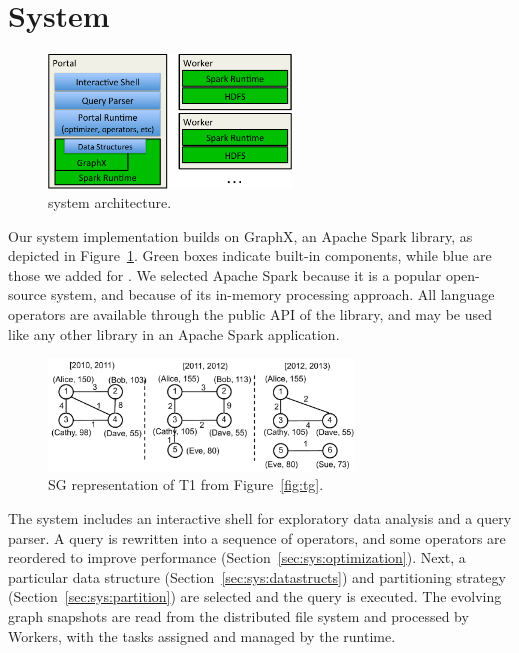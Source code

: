 \section{System}
\label{sec:sys}

\begin{figure}[t!]
\begin{center}
\includegraphics[height=1.4in]{figs/architecture.pdf}
\caption{\ql system architecture.}
\label{fig:arch}
\end{center}
\end{figure}

Our \ql system implementation builds on GraphX, an Apache Spark
library, as depicted in Figure~\ref{fig:arch}.  Green boxes indicate
built-in components, while blue are those we added for \ql.  We
selected Apache Spark because it is a popular open-source system, and
because of its in-memory processing approach.  All language operators
are available through the public API of the \ql library, and may be
used like any other library in an Apache Spark application.

\begin{figure}[t!]
\includegraphics[width=3.2in]{figs/sgp.pdf}
\caption{SG representation of T1 from Figure~\ref{fig:tg}.}
\label{fig:sgp}
\end{figure}

The \ql system includes an interactive shell for exploratory data
analysis and a query parser.  A \ql query is rewritten into a sequence
of operators, and some operators are reordered to improve performance
(Section~\ref{sec:sys:optimization}).  Next, a particular data
structure (Section~\ref{sec:sys:datastructs}) and partitioning
strategy (Section~\ref{sec:sys:partition}) are selected and the query
is executed.  The evolving graph snapshots are read from the
distributed file system and processed by Workers, with the tasks
assigned and managed by the runtime.

